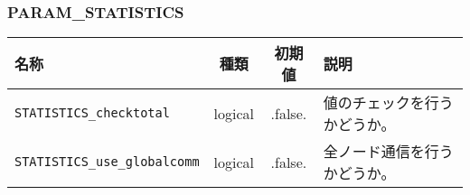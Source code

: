 

\subsubsection{PARAM\_STATISTICS}
\begin{tabularx}{150mm}{|l|c|c|X|} \hline
 \rowcolor[gray]{0.9} 名称 & 種類 & 初期値 & 説明 \\ \hline
 \verb|STATISTICS_checktotal| & logical & .false. & 値のチェックを行うかどうか。 \\ \hline
 \verb|STATISTICS_use_globalcomm| & logical & .false. & 全ノード通信を行うかどうか。 \\ \hline
\end{tabularx}


